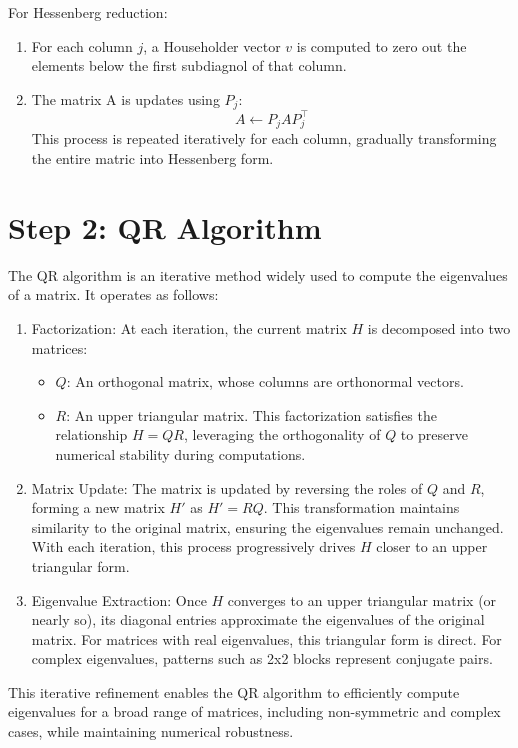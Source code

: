 \documentclass[a4paper,11pt,oneside]{report}
\begin{document}
For Hessenberg reduction:
\begin{enumerate}
    \item For each column $j$, a Householder vector $v$ is computed to zero out the elements below the first subdiagnol of that column.
    \item The matrix A is updates using $P_j$:
    \[
    A \leftarrow P_jAP_j^\top
    \]
    This process is repeated iteratively for each column, gradually transforming the entire matric into Hessenberg form.
\end{enumerate}

\section{ Step 2: QR Algorithm}
The QR algorithm is an iterative method widely used to compute the eigenvalues of a matrix. It operates as follows:
\begin{enumerate}

\item Factorization: At each iteration, the current matrix \( H \) is decomposed into two matrices:
\begin{itemize}

   \item \( Q \): An orthogonal matrix, whose columns are orthonormal vectors.
   \item \( R \): An upper triangular matrix.
   This factorization satisfies the relationship \( H = QR \), leveraging the orthogonality of \( Q \) to preserve numerical stability during computations.
\end{itemize}
\item Matrix Update: The matrix is updated by reversing the roles of \( Q \) and \( R \), forming a new matrix \( H' \) as \( H' = RQ \). This transformation maintains similarity to the original matrix, ensuring the eigenvalues remain unchanged. With each iteration, this process progressively drives \( H \) closer to an upper triangular form.

\item Eigenvalue Extraction: Once \( H \) converges to an upper triangular matrix (or nearly so), its diagonal entries approximate the eigenvalues of the original matrix. For matrices with real eigenvalues, this triangular form is direct. For complex eigenvalues, patterns such as 2x2 blocks represent conjugate pairs.
\end{enumerate}
This iterative refinement enables the QR algorithm to efficiently compute eigenvalues for a broad range of matrices, including non-symmetric and complex cases, while maintaining numerical robustness.
\end{document}
